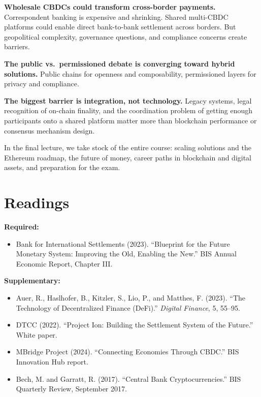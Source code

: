 \documentclass[11pt,a4paper]{article}
\begin{document}
\textbf{Wholesale CBDCs could transform cross-border payments.} Correspondent banking is expensive and shrinking. Shared multi-CBDC platforms could enable direct bank-to-bank settlement across borders. But geopolitical complexity, governance questions, and compliance concerns create barriers.

\textbf{The public vs.\ permissioned debate is converging toward hybrid solutions.} Public chains for openness and composability, permissioned layers for privacy and compliance.

\textbf{The biggest barrier is integration, not technology.} Legacy systems, legal recognition of on-chain finality, and the coordination problem of getting enough participants onto a shared platform matter more than blockchain performance or consensus mechanism design.

In the final lecture, we take stock of the entire course: scaling solutions and the Ethereum roadmap, the future of money, career paths in blockchain and digital assets, and preparation for the exam.

\section*{Readings}

\textbf{Required:}
\begin{itemize}
    \item Bank for International Settlements (2023). ``Blueprint for the Future Monetary System: Improving the Old, Enabling the New.'' BIS Annual Economic Report, Chapter III.
\end{itemize}

\textbf{Supplementary:}
\begin{itemize}
    \item Auer, R., Haslhofer, B., Kitzler, S., Lio, P., and Matthes, F. (2023). ``The Technology of Decentralized Finance (DeFi).'' \textit{Digital Finance}, 5, 55--95.
    \item DTCC (2022). ``Project Ion: Building the Settlement System of the Future.'' White paper.
    \item MBridge Project (2024). ``Connecting Economies Through CBDC.'' BIS Innovation Hub report.
    \item Bech, M. and Garratt, R. (2017). ``Central Bank Cryptocurrencies.'' BIS Quarterly Review, September 2017.
\end{itemize}

\end{document}
